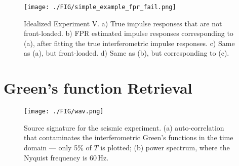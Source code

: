 \begin{figure*}
	\centering
	{
	\texttt{[image: ./FIG/simple\_example\_fpr\_fail.png]}
		}
	{
	\begin{tikzpicture}
		
	\end{tikzpicture}
	}
	\caption{
		Idealized Experiment V.
		a) True impulse responses that are not front-loaded.
		b) FPR estimated impulse responses corresponding to (a), 
		after fitting the
		true interferometric impulse responses.
		c) Same as (a), but front-loaded.
		d) Same as (b), but corresponding to (c).
	}
	\label{fig:simple_example_fpr_fail}
\end{figure*}




\section{Green's function Retrieval}

\begin{figure*}
	\centering
	\centering
	{
	\texttt{[image: ./FIG/wav.png]}
		}
		{
	
	}
 \caption{
	 Source signature for the seismic experiment.
	 (a) auto-correlation that contaminates the interferometric Green's functions in the time domain ---
	 only 5\% of $T$ is plotted;
	 (b) power spectrum, where the Nyquist frequency is $60\,$Hz.
 }
 \label{fig:wavobs}
\end{figure*}
%
%		
%
%		



